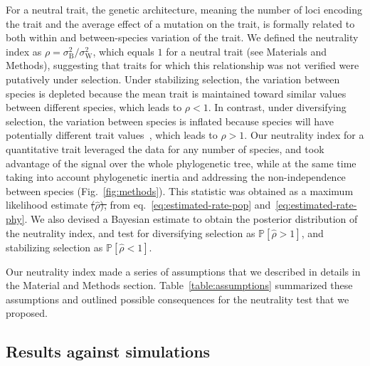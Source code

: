 \documentclass{article}
\newcommand{\proba}{\mathbb{P}}
\newcommand{\RateBetween}{\sigma^2_{\mathrm{B}}}
\newcommand{\RateWhithin}{\sigma^2_{\mathrm{W}}}
\newcommand{\NI}{\rho}
\newcommand{\EstNI}{\widehat{\rho}}
\providecommand{\DIFaddtex}[1]{{\protect\color{blue}\uwave{#1}}} %
\providecommand{\DIFdeltex}[1]{{\protect\color{red}\sout{#1}}}                      %
\providecommand{\DIFaddbegin}{} %
\providecommand{\DIFaddend}{} %
\providecommand{\DIFdelbegin}{} %
\providecommand{\DIFdelend}{} %
\providecommand{\DIFadd}[1]{\texorpdfstring{\DIFaddtex{#1}}{#1}} %
\providecommand{\DIFdel}[1]{\texorpdfstring{\DIFdeltex{#1}}{}} %
\newcommand{\DIFscaledelfig}{0.5}
\newlength{\DIFdelgraphicswidth} %
\newlength{\DIFdelgraphicsheight} %
\newcommand{\DIFaddincludegraphics}[2][]{{\color{blue}\fbox{\DIFOincludegraphics[#1]{#2}}}} %
\newcommand{\DIFdelincludegraphics}[2][]{%
\sbox{\DIFdelgraphicsbox}{\DIFOincludegraphics[#1]{#2}}%
\settoboxwidth{\DIFdelgraphicswidth}{\DIFdelgraphicsbox} %
\settoboxtotalheight{\DIFdelgraphicsheight}{\DIFdelgraphicsbox} %
\scalebox{\DIFscaledelfig}{%
\parbox[b]{\DIFdelgraphicswidth}{\usebox{\DIFdelgraphicsbox}\\[-\baselineskip] \rule{\DIFdelgraphicswidth}{0em}}\llap{\resizebox{\DIFdelgraphicswidth}{\DIFdelgraphicsheight}{%
\setlength{\unitlength}{\DIFdelgraphicswidth}%
\begin{picture}(1,1)%
\thicklines\linethickness{2pt} %
{\color[rgb]{1,0,0}\put(0,0){\framebox(1,1){}}}%
{\color[rgb]{1,0,0}\put(0,0){\line( 1,1){1}}}%
{\color[rgb]{1,0,0}\put(0,1){\line(1,-1){1}}}%
\end{picture}%
}\hspace*{3pt}}} %
} %
\DeclareRobustCommand{\DIFaddbegin}{\DIFOaddbegin \let\includegraphics\DIFaddincludegraphics} %
\DeclareRobustCommand{\DIFaddend}{\DIFOaddend \let\includegraphics\DIFOincludegraphics} %
\DeclareRobustCommand{\DIFdelbegin}{\DIFOdelbegin \let\includegraphics\DIFdelincludegraphics} %
\DeclareRobustCommand{\DIFdelend}{\DIFOaddend \let\includegraphics\DIFOincludegraphics} %
\begin{document}
For a neutral trait, the genetic architecture, meaning the number of loci encoding the trait and the average effect of a mutation on the trait, is formally related to both within and between-species variation of the trait.
We defined the neutrality index as $\NI = \RateBetween/\RateWhithin$, which equals $1$ for a neutral trait (see Materials and Methods), suggesting that traits for which this relationship was not verified were putatively under selection.
Under stabilizing selection, the variation between species is depleted because the mean trait is maintained toward similar values between different species, which leads to $\NI < 1$.
In contrast, under diversifying selection, the variation between species is inflated because species will have potentially different trait values~\citep{hansen_stabilizing_1997}, which leads to $\NI > 1$.
Our neutrality index for a quantitative trait leveraged the data for any number of species, and took advantage of the signal over the whole phylogenetic tree, while at the same time taking into account phylogenetic inertia and addressing the non-independence between species (Fig.~\ref{fig:methods}).
This statistic was obtained as a maximum likelihood estimate \DIFdelbegin \DIFdel{($\EstNI$), }\DIFdelend from eq.~\ref{eq:estimated-rate-pop} and~\ref{eq:estimated-rate-phy}.
We also devised a Bayesian estimate to obtain the posterior distribution of the neutrality index, and test for diversifying selection as \DIFdelbegin \DIFdel{$\proba [\EstNI > 1]$}\DIFdelend \DIFaddbegin \DIFadd{$\proba [\NI > 1]$}\DIFaddend , and stabilizing selection as \DIFdelbegin \DIFdel{$\proba [\EstNI < 1]$}\DIFdelend \DIFaddbegin \DIFadd{$\proba [\NI < 1]$}\DIFaddend .

Our neutrality index made a series of assumptions that we described in details in the Material and Methods section.
Table~\ref{table:assumptions} summarized these assumptions and outlined possible consequences for the neutrality test that we proposed.

\subsection*{Results against simulations}\label{subsec:results-against-simulations}
\end{document}
